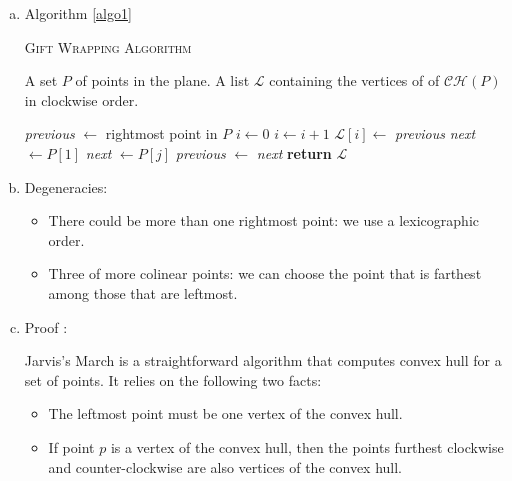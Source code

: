 \documentclass[11pt]{article}
\begin{document}
\begin{enumerate}[a.]
    \item Algorithm \ref{algo1} 

\begin{algorithm}[ht!] 
    \caption{\textsc{Gift Wrapping Algorithm}}
    \label{algo1}
    \begin{algorithmic}[1]

    \Require A set $P$ of points in the plane.
    \Ensure A list $\mathcal{L}$ containing the vertices of of $\mathcal{CH}(P)$ in clockwise order.
    
    \State \textit{previous} $\gets$ rightmost point in $P$
    \State $ i \gets 0$
    \Repeat 
            \State $i \gets i+1$
            \State $\mathcal{L}[i] \gets$ \textit{previous}
            \State \textit{next} $\gets P[1]$
                \State \textit{next} $\gets P[j]$
                \EndIf
            \EndFor
            \State \textit{previous} $\gets$ \textit{next}
    \State \textbf{return} $\mathcal{L}$
    \EndFunction
    \end{algorithmic}
\end{algorithm}

    \item Degeneracies: 
    \begin{itemize}
        \item There could be more than one rightmost point: we use a lexicographic order.
        \item Three of more colinear points: we can choose the point that is farthest among those that are leftmost.
        
        
    \end{itemize}
    \item Proof \cite{l14}: 
    
    Jarvis's March is a straightforward algorithm that computes convex hull for a set of points.  It relies on the following two facts:
    \begin{itemize}
        \item The leftmost point must be one vertex of the convex hull.
        \item If point $p$ is a vertex of the convex hull, then the points furthest clockwise and counter-clockwise are also vertices of the convex hull.
    \end{itemize}
    

\end{enumerate}
\end{document}
